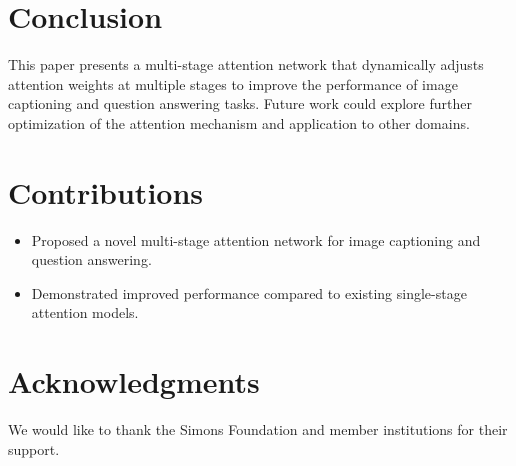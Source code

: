 \documentclass{article}
\begin{document}
\section{Conclusion}
This paper presents a multi-stage attention network that dynamically adjusts attention weights at multiple stages to improve the performance of image captioning and question answering tasks. Future work could explore further optimization of the attention mechanism and application to other domains.

\section{Contributions}
\begin{itemize}
    \item Proposed a novel multi-stage attention network for image captioning and question answering.
    \item Demonstrated improved performance compared to existing single-stage attention models.
\end{itemize}

\section*{Acknowledgments}
We would like to thank the Simons Foundation and member institutions for their support.



\end{document}
